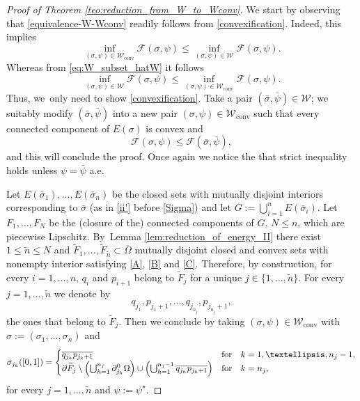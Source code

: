 \documentclass[11pt]{article}
\numberwithin{equation}{section}
\newcommand{\largercomp}{\mathcal W}
\let\Om\Omega
\newcommand\admclassconv{{\mathcal W_\mathrm{conv}}}
\theoremstyle{definition}
\begin{document}
\begin{proof}[Proof of Theorem \ref{teo:reduction_from_W_to_Wconv}]
We start by observing that \eqref{equivalence-W-Wconv} readily follows from \eqref{convexification}. Indeed, this implies
\begin{equation*}
\inf_{(\sigma,\psi)\in \admclassconv}
\mathcal{F}(\sigma,\psi)\le \inf_{(\sigma,\psi)
\in\largercomp} {\mathcal{F}}(\sigma,\psi)
.
\end{equation*}
Whereas from
\eqref{eq:W_subset_hatW}
it follows
\begin{equation*}
\inf_{(\sigma,\psi)\in\largercomp}
{\mathcal{F}}(\sigma,\psi)\le\inf_{(\sigma,\psi)\in\admclassconv }\mathcal{F}(\sigma,\psi).
\end{equation*}
Thus, we~only need to show \eqref{convexification}.
Take a pair $(\bar\sigma,\bar\psi)\in\largercomp$; we
suitably modify $(\bar\sigma,\bar\psi)$ into a new pair
$(\sigma,\psi)\in\admclassconv$ such that every connected component of $E(\sigma)$ is convex and
\begin{equation*}
\mathcal{F}(\sigma,\psi)\le{\mathcal F}(\bar\sigma,\bar\psi),
\end{equation*}
and this will conclude the proof. Once again we notice the that strict inequality holds unless $\psi=\bar\psi$ a.e.

Let $E(\bar\sigma_1),\dots,E(\bar\sigma_n)$ be the closed sets with mutually disjoint interiors corresponding to $\bar\sigma$ (as in \ref{ii'}
before \eqref{Sigma}) and let $G:=\bigcup_{i=1}^nE(\bar\sigma_i)$. Let
$F_1,\dots, F_N$ be the
(closure of the) connected components
of $G$, $N\leq n$, which are piecewise Lipschitz.
By~Lemma \ref{lem:reduction_of_energy_II} there exist $1\le \tilde n\le N$ and $\widetilde F_1,\dots,\widetilde F_{\tilde n}\subset\overline\Om$ mutually disjoint closed and convex sets with nonempty interior satisfying \eqref{A}, \eqref{B} and \eqref{C}.
Therefore, by construction, for every $i=1,\dots,n$,
$q_i$ and $p_{i+1}$ belong to $\widetilde F_j$ for a unique $j\in\{1,\dots,\tilde n\}$.
For every $j=1,\dots,\tilde n$ we denote by
\begin{equation*}
q_{j_1},p_{j_1+1},\dots, q_{j_{n_j}},p_{j_{n_j}+1},
\end{equation*}
the ones that belong to $\widetilde F_j$. Then we conclude by
taking $(\sigma,\psi)\in\admclassconv$ with $\sigma:=(\sigma_1,\dots,\sigma_n)$ and
\begin{equation*}
\sigma_{j_k}([0,1])=\begin{cases}
\overline{q_{j_k}p_{j_k+1}}&\text{for}\quad k=1,\dots,n_j-1,\\
\partial\widetilde F_j\setminus\Bigl(\bigcup_{h=1}^{n_j}\partial^0_{j_h}\Om\Bigr)\cup
\Bigl(\bigcup_{h=1}^{n_j-1}\overline{q_{j_h}p_{j_h+1}}\Bigr)&\text{for}\quad k=n_j,
\end{cases}
\end{equation*}
for every $j=1,\dots,\tilde n$ and $\psi:=\psi^\star$.
\end{proof}
\end{document}
